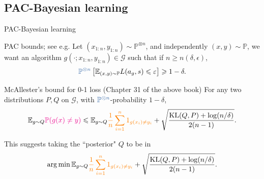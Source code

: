 \documentclass[10pt]{beamer}
\begin{document}
\subsection{PAC-Bayesian learning}
\begin{frame}{PAC-Bayesian learning}
\begin{block}{PAC bounds; see e.g. \citep{ShBe14}}
Let $(x_{1:n},y_{1:n})\sim \mathbb{P}^{\otimes n}$, and independently $(x,y)\sim \mathbb{P}$, we want an algorithm $g(\cdot; x_{1:n}, y_{1:n})\in\mathcal G$ such that if $n\geq n(\delta,\epsilon)$,
$$
\unn{\mathbb{P}^{\otimes n}}\left[\mathbb{E}_{(x,y)\sim \mathbb P} L(a_g,s) \leq \epsilon\right] \geq 1-\delta.
$$
\end{block}
\begin{block}{McAllester's bound for 0-1 loss (Chapter 31 of the above book)}
For any two distributions $P,Q$ on $\mathcal G$, with $\unn{\mathbb{P}^{\otimes n}}$-probability $1-\delta$,
$$
\mathbb E_{g\sim Q} \textcolor{magenta}{\mathbb{P} (g(x)\neq y)} \leqslant \mathbb{E}_{g\sim Q} \textcolor{orange}{\frac1n\sum_{i=1}^n 1_{g(x_i)\neq y_i}} + \sqrt{\frac{\text{KL}(Q,P) + \log(n/\delta)}{2(n-1)}}.
$$
\end{block}

This suggests taking the ``posterior" $Q$ to be in
$$
\operatorname*{arg\,min} \mathbb{E}_{g\sim Q} \textcolor{orange}{\frac1n\sum_{i=1}^n 1_{g(x_i)\neq y_i}} + \sqrt{\frac{\text{KL}(Q,P) + \log(n/\delta)}{2(n-1)}}.
$$
\end{frame}
\end{document}
